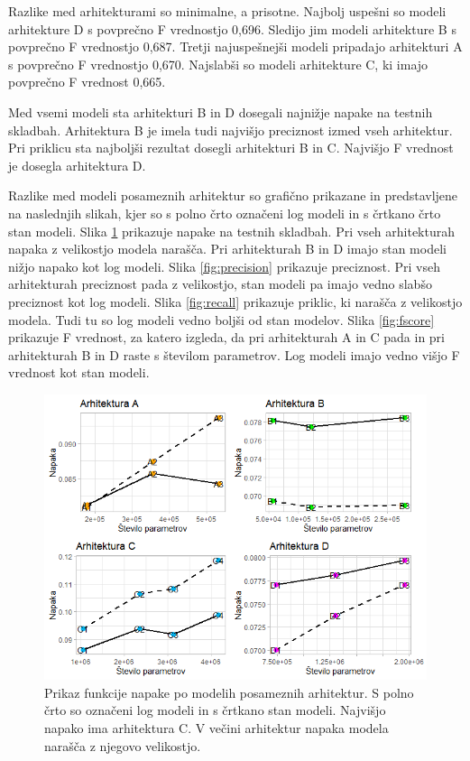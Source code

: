 \documentclass[a4paper, 12pt, openright]{book}
\begin{document}
Razlike med arhitekturami so minimalne, a prisotne.
Najbolj uspešni so modeli arhitekture D s povprečno F vrednostjo 0,696.
Sledijo jim modeli arhitekture B s povprečno F vrednostjo 0,687.
Tretji najuspešnejši modeli pripadajo arhitekturi A s povprečno F vrednostjo 0,670.
Najslabši so modeli arhitekture C, ki imajo povprečno F vrednost 0,665.

Med vsemi modeli sta arhitekturi B in D dosegali najnižje napake na testnih skladbah.
Arhitektura B je imela tudi najvišjo preciznost izmed vseh arhitektur.
Pri priklicu sta najboljši rezultat dosegli arhitekturi B in C.
Najvišjo F vrednost je dosegla arhitektura D.

Razlike med modeli posameznih arhitektur so grafično prikazane in predstavljene na naslednjih slikah, kjer so s polno črto označeni log modeli in s črtkano črto stan modeli.
Slika \ref{fig:loss} prikazuje napake na testnih skladbah.
Pri vseh arhitekturah napaka z velikostjo modela narašča.
Pri arhitekturah B in D imajo stan modeli nižjo napako kot log modeli.
Slika \ref{fig:precision} prikazuje preciznost.
Pri vseh arhitekturah preciznost pada z velikostjo, stan modeli pa imajo vedno slabšo preciznost kot log modeli.
Slika \ref{fig:recall} prikazuje priklic, ki narašča z velikostjo modela. Tudi tu so log modeli vedno boljši od stan modelov.
Slika \ref{fig:fscore} prikazuje F vrednost, za katero izgleda, da pri arhitekturah A in C pada in pri arhitekturah B in D raste s številom parametrov. Log modeli imajo vedno višjo F vrednost kot stan modeli.

\begin{figure}
    \centering
    \includegraphics[width=\textwidth]{loss.png}
    \caption{Prikaz funkcije napake po modelih posameznih arhitektur. S polno črto so označeni log modeli in s črtkano stan modeli. Najvišjo napako ima arhitektura C. V večini arhitektur napaka modela narašča z njegovo velikostjo.}
    \label{fig:loss}
\end{figure}
\end{document}
